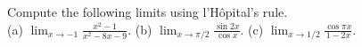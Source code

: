 Compute the following limits using l'H\^opital's rule.\\
(a) $\displaystyle \lim_{x\to -1} \frac{x^2-1} {x^2-8x-9}$.\answercheck\hwendpart
(b) $\displaystyle\lim_{x\to \pi/2} \frac{\sin 2x} {\cos x}$.\answercheck\hwendpart
(c) $\displaystyle\lim_{x\to 1/2} \frac{\cos \pi x} {1-2x}$.\answercheck\hwendpart
